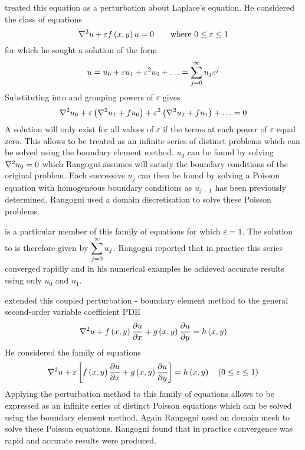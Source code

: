  treated 
this equation as a perturbation about Laplace's equation. He considered the class of equations
\begin{equation}
  \laplacian{}{u} + \varepsilon \fnof{f}{x,y} u = 0 \qquad 
    \text{where } 0 \leq \varepsilon \leq 1
\label{eq:eqnfamily}
\end{equation}
for which he sought a solution of the form
\begin{equation}
  u = u_{0} + \varepsilon u_{1} + \varepsilon^{2} u_{2} + \ldots =
   \displaystyle\sum_{j=0}^{\infty}  u_{j} \varepsilon^{j}
\label{eq:uexpan}
\end{equation}
Substituting  into  and grouping powers
 of $\varepsilon$ gives
\begin{equation}
  \laplacian{}{u_{0}} + \varepsilon \pbrac{\laplacian{}{u_{1}} + fu_{0}} +
  \varepsilon^{2} \pbrac{\laplacian{}{u_{2}} + fu_{1}} + \ldots = 0
\label{eq:groups}
\end{equation}
A solution will only exist for all values of $\varepsilon$ if the terms at
each power of $\varepsilon $ equal zero. This allows  to be
treated as an infinite series of distinct problems which can be solved
using the boundary element method. $u_{0}$ can be found by solving 
 $\laplacian{}{u_{0}} = 0$ which Rangogni assumes will satisfy the boundary 
conditions of the original problem.  Each successive $u_{j}$ can then be
found by solving a Poisson equation with homogeneous boundary conditions as 
 $u_{j-1}$ has been previously determined.  Rangogni used a domain
 discretisation to solve these Poisson problems.

 is a particular member of this family of equations for
which $\varepsilon =1$.  The solution to  is therefore
given by $ \displaystyle\sum_{j=0}^{\infty}  u_{j}$. Rangogni reported that in practice
this series converged rapidly and in his numerical examples he achieved
accurate results using only $u_{0}$ and $u_{1}$.

 extended this coupled perturbation - boundary
element method to the general second-order variable coefficient PDE
\begin{equation}
  \laplacian{}{u} + \fnof{f}{x,y} \delby{u}{x} + \fnof{g}{x,y} \delby{u}{y} =
  \fnof{h}{x,y}
\end{equation}
He considered the family of equations
\begin{equation}
  \laplacian{}{u} + \varepsilon \sqbrac{\fnof{f}{x,y} \delby{u}{x} +
    \fnof{g}{x,y} \delby{u}{y}} = \fnof{h}{x,y} 
    \quad (0 \leq \varepsilon \leq 1)
\label{eq:family2}
\end{equation}
Applying the perturbation method to this family of equations allows
 to be expressed as an infinite series of distinct Poisson
equations which can be solved using the boundary element method. Again
Rangogni used an domain mesh to solve these Poisson equations.  Rangogni
found that in practice convergence was rapid and accurate results were
produced.

